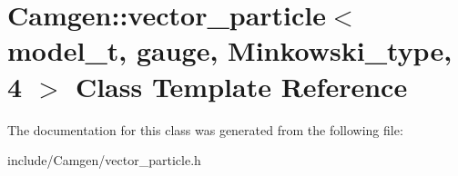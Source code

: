 \hypertarget{a00563}{\section{Camgen\-:\-:vector\-\_\-particle$<$ model\-\_\-t, gauge, Minkowski\-\_\-type, 4 $>$ Class Template Reference}
\label{a00563}
}


The documentation for this class was generated from the following file\-:\begin{DoxyCompactItemize}
\item 
include/\-Camgen/vector\-\_\-particle.\-h\end{DoxyCompactItemize}
